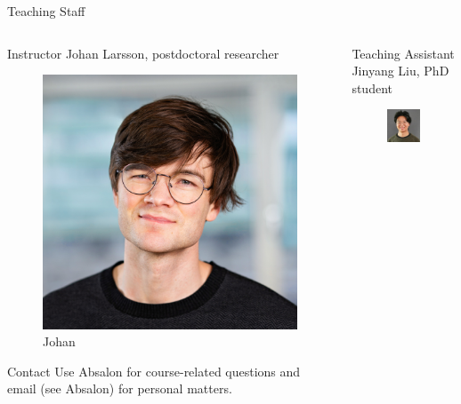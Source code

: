 \documentclass[
  ignorenonframetext,
  aspectratio=1610,
  onlytextwidth]{beamer}
\begin{document}
\begin{frame}{Teaching Staff}
\label{teaching-staff}
\begin{columns}[T]
\begin{column}{0.47\linewidth}
\begin{block}{Instructor}
\label{instructor}
Johan Larsson, postdoctoral researcher

\begin{figure}[H]

{\centering \includegraphics[width=0.5\linewidth,height=\textheight,keepaspectratio]{../images/johan.jpg}

}

\caption{Johan}

\end{figure}%

\begin{block}{Contact}
\label{contact}
Use Absalon for course-related questions and email (see Absalon) for
personal matters.
\end{block}
\end{block}
\end{column}

\pause

\begin{column}{0.47\linewidth}
\begin{block}{Teaching Assistant}
\label{teaching-assistant}
Jinyang Liu, PhD student

\begin{figure}[H]

{\centering \includegraphics[width=0.5\linewidth,height=\textheight,keepaspectratio]{../images/jinyang.jpg}

}
\end{figure}
\end{block}
\end{column}
\end{columns}
\end{frame}
\end{document}
